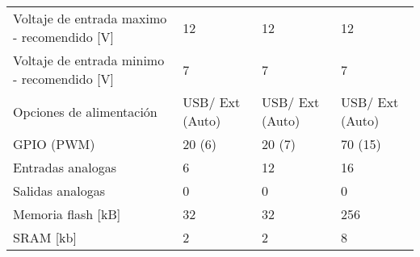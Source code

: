 \begin{longtable}{|p{4.9cm}|p{3.3cm}|p{3.3cm}|p{3.3cm}|}
	Voltaje de entrada maximo - recomendido [V] & 12                                                & 12                                                                              & 12                                                                                                           \\
	Voltaje de entrada minimo - recomendido [V] & 7                                                 & 7                                                                               & 7                                                                                                            \\
	Opciones de alimentación                    & USB/ Ext (Auto)                                   & USB/ Ext (Auto)                                                                 & USB/ Ext (Auto)                                                                                              \\
	GPIO (PWM)                                  & 20 (6)                                            & 20 (7)                                                                          & 70 (15)                                                                                                      \\
	Entradas analogas                           & 6                                                 & 12                                                                              & 16                                                                                                           \\
	Salidas analogas                            & 0                                                 & 0                                                                               & 0                                                                                                            \\
	Memoria flash [kB]                          & 32                                                & 32                                                                              & 256                                                                                                          \\
	SRAM [kb]                                   & 2                                                 & 2                                                                               & 8                                                                                                            \\

\end{longtable}
